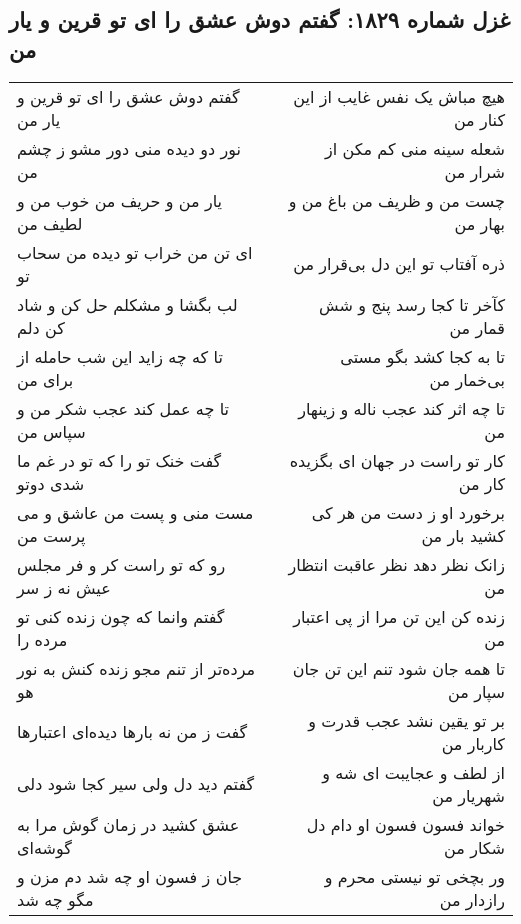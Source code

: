\begin{center}
\section*{غزل شماره ۱۸۲۹: گفتم دوش عشق را ای تو قرین و یار من}
\label{sec:1829}
\begin{longtable}{l p{0.5cm} r}
گفتم دوش عشق را ای تو قرین و یار من
&&
هیچ مباش یک نفس غایب از این کنار من
\\
نور دو دیده منی دور مشو ز چشم من
&&
شعله سینه منی کم مکن از شرار من
\\
یار من و حریف من خوب من و لطیف من
&&
چست من و ظریف من باغ من و بهار من
\\
ای تن من خراب تو دیده من سحاب تو
&&
ذره آفتاب تو این دل بی‌قرار من
\\
لب بگشا و مشکلم حل کن و شاد کن دلم
&&
کآخر تا کجا رسد پنج و شش قمار من
\\
تا که چه زاید این شب حامله از برای من
&&
تا به کجا کشد بگو مستی بی‌خمار من
\\
تا چه عمل کند عجب شکر من و سپاس من
&&
تا چه اثر کند عجب ناله و زینهار من
\\
گفت خنک تو را که تو در غم ما شدی دوتو
&&
کار تو راست در جهان ای بگزیده کار من
\\
مست منی و پست من عاشق و می پرست من
&&
برخورد او ز دست من هر کی کشید بار من
\\
رو که تو راست کر و فر مجلس عیش نه ز سر
&&
زانک نظر دهد نظر عاقبت انتظار من
\\
گفتم وانما که چون زنده کنی تو مرده را
&&
زنده کن این تن مرا از پی اعتبار من
\\
مرده‌تر از تنم مجو زنده کنش به نور هو
&&
تا همه جان شود تنم این تن جان سپار من
\\
گفت ز من نه بارها دیده‌ای اعتبارها
&&
بر تو یقین نشد عجب قدرت و کاربار من
\\
گفتم دید دل ولی سیر کجا شود دلی
&&
از لطف و عجایبت ای شه و شهریار من
\\
عشق کشید در زمان گوش مرا به گوشه‌ای
&&
خواند فسون فسون او دام دل شکار من
\\
جان ز فسون او چه شد دم مزن و مگو چه شد
&&
ور بچخی تو نیستی محرم و رازدار من
\\
\end{longtable}
\end{center}
